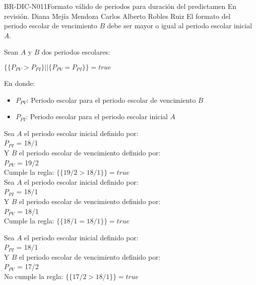 \begin{BusinessRule}{BR-DIC-N011}{Formato válido de periodos para duración del predictamen}
	{\bcCondition}    %
	{\btEnabler}     %
	{\blControlling}    %
	\BRItem[Estado] En revisión.
	 Diana Mejía Mendoza
	 Carlos Alberto Robles Ruiz
	\BRItem[Descripción] El formato del periodo escolar de vencimiento $B$ debe ser mayor o igual al periodo escolar inicial $A$.
	
	\BRItem[Sentencia] Sean $A$ y $B$ dos periodos escolares:
	\begin{center}
		$ \{ \{P_{PV} > P_{PI} \} || \{P_{PV} = P_{PI} \} \} = true$ 
	\end{center}
	
	En donde:
	\begin{itemize}
		\item $P_{PV}$: Periodo escolar para el periodo escolar de vencimiento $B$
		\item $P_{PI}$: Periodo escolar para el periodo escolar inicial $A$
	\end{itemize} 
	
	
	Sea $A$ el periodo escolar inicial definido por: \\
	$P_{PI}$ = 18/1\\
	Y $B$ el periodo escolar de vencimiento definido por:\\
	$P_{PV}$ = 19/2\\
	
	Cumple la regla:
	$ \{ \{19/2 > 18/1 \} \} = true$ \\
	
	Sea $A$ el periodo escolar inicial definido por: \\
	$P_{PI}$ = 18/1\\
	Y $B$ el periodo escolar de vencimiento definido por:\\
	$P_{PV}$ = 18/1\\
	
	Cumple la regla:
	$ \{ \{18/1 = 18/1 \} \} = true$  
	
	Sea $A$ el periodo escolar inicial definido por: \\
	$P_{PI}$ = 18/1\\
	Y $B$ el periodo escolar de vencimiento definido por:\\
	$P_{PV}$ = 17/2\\
	
	No cumple la regla:
	$ \{ \{17/2 > 18/1 \} \} = true$ \\
	
	
\end{BusinessRule}


